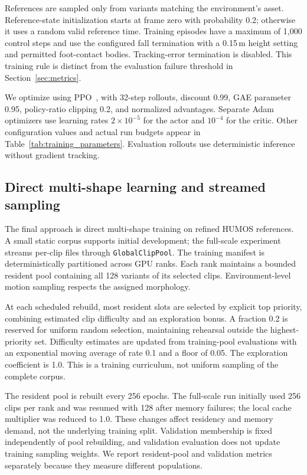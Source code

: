 \documentclass[11pt]{article}
\begin{document}
References are sampled only from variants matching the environment's asset.
Reference-state initialization starts at frame zero with probability 0.2;
otherwise it uses a random valid reference time. Training episodes have a
maximum of 1,000 control steps and use the configured fall termination with
a 0.15\,m height setting and permitted foot-contact bodies. Tracking-error
termination is disabled. This training rule is distinct from the evaluation
failure threshold in Section~\ref{sec:metrics}.

We optimize using PPO~\cite{ppo}, with 32-step rollouts, discount 0.99,
GAE parameter 0.95, policy-ratio clipping 0.2, and normalized advantages.
Separate Adam optimizers use learning rates $2\times10^{-5}$ for the actor
and $10^{-4}$ for the critic. Other configuration values and actual run
budgets appear in Table~\ref{tab:training_parameters}. Evaluation rollouts
use deterministic inference without gradient tracking.

\subsection{Direct multi-shape learning and streamed sampling}\label{sec:sampling}

The final approach is direct multi-shape training on refined HUMOS
references. A small static corpus supports initial development; the
full-scale experiment streams per-clip files through \texttt{GlobalClipPool}.
The training manifest is deterministically partitioned across GPU ranks.
Each rank maintains a bounded resident pool containing all 128 variants
of its selected clips. Environment-level motion sampling respects the
assigned morphology.

At each scheduled rebuild, most resident slots are selected by explicit
top priority, combining estimated clip difficulty and an exploration bonus.
A fraction 0.2 is reserved for uniform random selection, maintaining rehearsal
outside the highest-priority set. Difficulty estimates are updated from
training-pool evaluations with an exponential moving average of rate 0.1
and a floor of 0.05. The exploration coefficient is 1.0.
This is a training curriculum, not uniform sampling of the complete corpus.

The resident pool is rebuilt every 256 epochs. The full-scale run initially
used 256 clips per rank and was resumed with 128 after memory failures; the
local cache multiplier was reduced to 1.0. These changes affect residency
and memory demand, not the underlying training split. Validation membership
is fixed independently of pool rebuilding, and validation evaluation does
not update training sampling weights. We report resident-pool and validation
metrics separately because they measure different populations.
\end{document}
